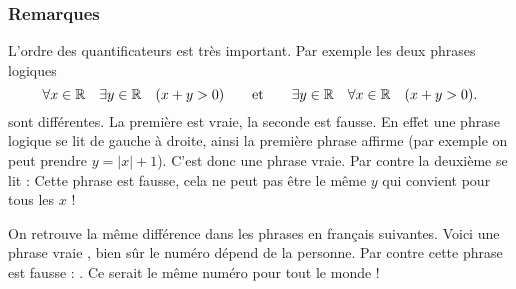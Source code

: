 \documentclass[11pt,class=report,crop=false]{standalone}
\begin{document}
\subsubsection*{Remarques}

L'ordre des quantificateurs est très important.
Par exemple les deux phrases logiques
 $$\forall x \in \mathbb{R} \quad  \exists y \in \mathbb{R} \quad (x+y>0) \qquad \text{et}\qquad
\exists y \in \mathbb{R} \quad \forall x \in \mathbb{R} \quad (x+y>0).$$
sont différentes. La première est vraie, la seconde est fausse.
En effet une phrase logique se lit de gauche à droite, ainsi la première phrase affirme
(par exemple on peut prendre $y=|x|+1$).
C'est donc une phrase vraie. Par contre la deuxième se lit :
 Cette phrase est fausse,
cela ne peut pas être le même $y$ qui convient pour tous les $x$ !


On retrouve la même différence dans les phrases en français suivantes.
Voici une phrase vraie ,
bien sûr le numéro dépend de la personne. Par contre cette phrase est fausse :
. Ce serait le même numéro pour tout le monde !

\bigskip
\end{document}
